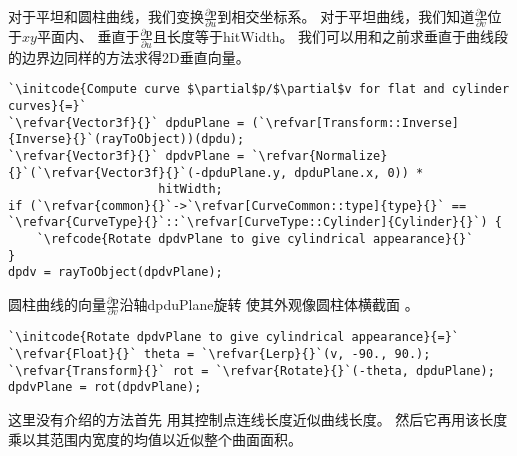 对于平坦和圆柱曲线，我们变换$\displaystyle\frac{\partial \bm p}{\partial u}$到相交坐标系。
对于平坦曲线，我们知道$\displaystyle\frac{\partial \bm p}{\partial v}$位于$xy$平面内、
垂直于$\displaystyle\frac{\partial \bm p}{\partial u}$且长度等于{\ttfamily hitWidth}。
我们可以用和之前求垂直于曲线段的边界边同样的方法求得2D垂直向量。
\begin{lstlisting}
`\initcode{Compute curve $\partial$p/$\partial$v for flat and cylinder curves}{=}`
`\refvar{Vector3f}{}` dpduPlane = (`\refvar[Transform::Inverse]{Inverse}{}`(rayToObject))(dpdu);
`\refvar{Vector3f}{}` dpdvPlane = `\refvar{Normalize}{}`(`\refvar{Vector3f}{}`(-dpduPlane.y, dpduPlane.x, 0)) *
                     hitWidth;
if (`\refvar{common}{}`->`\refvar[CurveCommon::type]{type}{}` == `\refvar{CurveType}{}`::`\refvar[CurveType::Cylinder]{Cylinder}{}`) {
    `\refcode{Rotate dpdvPlane to give cylindrical appearance}{}`
}
dpdv = rayToObject(dpdvPlane);
\end{lstlisting}

圆柱曲线的向量$\displaystyle\frac{\partial \bm p}{\partial v}$沿轴{\ttfamily dpduPlane}旋转
使其外观像圆柱体横截面
。
\begin{lstlisting}
`\initcode{Rotate dpdvPlane to give cylindrical appearance}{=}`
`\refvar{Float}{}` theta = `\refvar{Lerp}{}`(v, -90., 90.);
`\refvar{Transform}{}` rot = `\refvar{Rotate}{}`(-theta, dpduPlane);
dpdvPlane = rot(dpdvPlane);
\end{lstlisting}

这里没有介绍的方法首先
用其控制点连线长度近似曲线长度。
然后它再用该长度乘以其范围内宽度的均值以近似整个曲面面积。